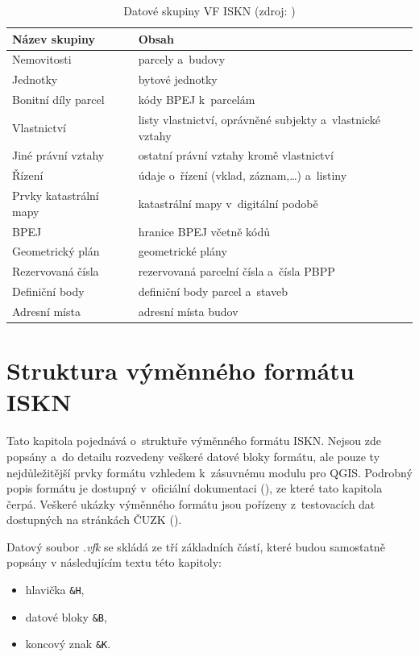 \documentclass[a4paper,12pt,oneside]{book}
\begin{document}
\begin{table}[htbp]
\centering
\caption[Datové skupiny VF ISKN]{Datové skupiny VF ISKN (zdroj: \cite{nvf_cuzk})}
\begin{tabular}{ll}
\toprule
\textbf{Název skupiny} & \textbf{Obsah} \\ 
\midrule
Nemovitosti & parcely a~budovy \\ 
Jednotky & bytové jednotky \\ 
Bonitní díly parcel & kódy BPEJ k~parcelám \\ 
Vlastnictví & \parbox{220pt}{listy vlastnictví, oprávněné subjekty a~vlastnické vztahy} \\ 
Jiné právní vztahy & ostatní právní vztahy kromě vlastnictví \\ 
Řízení & údaje o~řízení (vklad, záznam,…) a~listiny \\ 
Prvky katastrální mapy & katastrální mapy v~digitální podobě \\ 
BPEJ & hranice BPEJ včetně kódů \\ 
Geometrický plán & geometrické plány \\ 
Rezervovaná čísla & rezervovaná parcelní čísla a~čísla PBPP \\ 
Definiční body & definiční body parcel a~staveb \\ 
Adresní místa & adresní místa budov \\
\bottomrule
\end{tabular}
\label{t_datove_skupiny}
\end{table}

\newpage
\section{Struktura výměnného formátu ISKN}

Tato kapitola pojednává o~struktuře výměnného formátu ISKN. Nejsou zde
popsány a~do detailu rozvedeny veškeré datové bloky formátu, ale pouze
ty nejdůležitější prvky formátu vzhledem k~zásuvnému modulu pro
QGIS. Podrobný popis formátu je dostupný v~oficiální dokumentaci
(\cite{vfk_struktura}), ze které tato kapitola čerpá. Veškeré ukázky
výměnného formátu jsou pořízeny z~testovacích dat dostupných na
stránkách ČUZK (\cite{nvf_cuzk}).

Datový soubor \textit{.vfk} se skládá ze tří základních částí, které
budou samostatně popsány v následujícím textu této kapitoly:

\begin{itemize}
 \item hlavička \texttt{\&H},
 \item datové bloky \texttt{\&B},
 \item koncový znak \texttt{\&K}.
\end{itemize}
\end{document}
